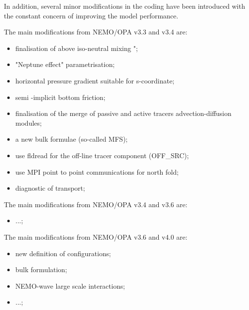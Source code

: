 \documentclass[../main/NEMO_manual]{subfiles}
\begin{document}
In addition, several minor modifications in the coding have been introduced with the constant concern of
improving the model performance.

The main modifications from NEMO/OPA v3.3 and v3.4 are:

\begin{itemize}
\item finalisation of above iso-neutral mixing \citep{Griffies_al_JPO98}";
\item "Neptune effect" parametrisation;
\item horizontal pressure gradient suitable for s-coordinate;
\item semi -implicit bottom friction;
\item finalisation of the merge of passive and active tracers advection-diffusion modules;
\item a new bulk formulae (so-called MFS);
\item use fldread for the off-line tracer component (OFF\_SRC);
\item use MPI point to point communications for north fold;
\item diagnostic of transport;
\end{itemize}

The main modifications from NEMO/OPA v3.4 and v3.6 are:

\begin{itemize}
 \item ...;
\end{itemize}

The main modifications from NEMO/OPA v3.6 and v4.0 are:

\begin{itemize}
\item new definition of configurations;
\item bulk formulation;
\item NEMO-wave large scale interactions;
\item ...;
\end{itemize}

\biblio

\pindex
\end{document}
